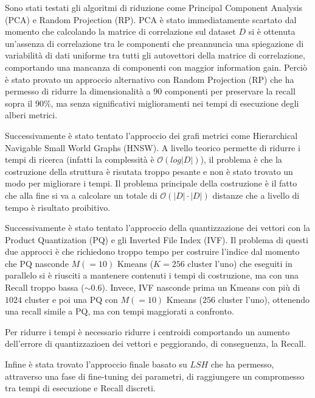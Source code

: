 Sono stati testati gli algoritmi di riduzione come Principal Component Analysis (PCA) 
e Random Projection (RP). PCA è stato immediatamente scartato dal momento che 
calcolando la matrice di correlazione sul dataset $D$ si è ottenuta un'assenza 
di correlazione tra le componenti che preannuncia una spiegazione di variabilità 
di dati uniforme tra tutti gli autovettori della matrice di correlazione, comportando 
una mancanza di componenti con maggior information gain. Perciò è stato provato 
un approccio alternativo con Random Projection (RP) che ha permesso di ridurre la 
dimensionalità a $90$ componenti per preservare la recall sopra il $90\%$, ma 
senza significativi miglioramenti nei tempi di esecuzione degli alberi metrici.

Successivamente è stato tentato l'approccio dei grafi metrici come Hierarchical 
Navigable Small World Graphs (HNSW). A livello teorico permette di ridurre i tempi
di ricerca (infatti la complessità è $\mathcal{O}(log |D|)$), il problema è 
che la costruzione della struttura è risutata troppo pesante e non è stato trovato 
un modo per migliorare i tempi. Il problema principale della costruzione è 
il fatto che alla fine si va a calcolare un totale di $\mathcal{O}(|D|\cdot |D|)$
distanze che a livello di tempo è risultato proibitivo.

Successivamente è stato tentato l'approccio della quantizzazione dei vettori con 
la Product Quantization (PQ) e gli Inverted File Index (IVF). Il problema di questi 
due approcci è che richiedono troppo tempo per costruire l'indice dal momento che 
PQ nasconde $M(=10)$ Kmeans ($K=256$ cluster l'uno) che eseguiti in parallelo si 
è riusciti a mantenere contenuti i tempi di costruzione, ma con una Recall troppo 
bassa ($\sim 0.6$). Invece, IVF nasconde prima un Kmeans con più di $1024$ cluster 
e poi una PQ con $M(=10)$ Kmeans ($256$ cluster l'uno), ottenendo una recall simile 
a PQ, ma con tempi maggiorati a confronto. 

Per ridurre i tempi è necessario ridurre i centroidi comportando un aumento dell'errore 
di quantizzazioen dei vettori e peggiorando, di conseguenza, la Recall.

Infine è stata trovato l'approccio finale basato su $LSH$ che ha permesso, attraverso 
una fase di fine-tuning dei parametri, di raggiungere un compromesso tra tempi di 
esecuzione e Recall discreti.








